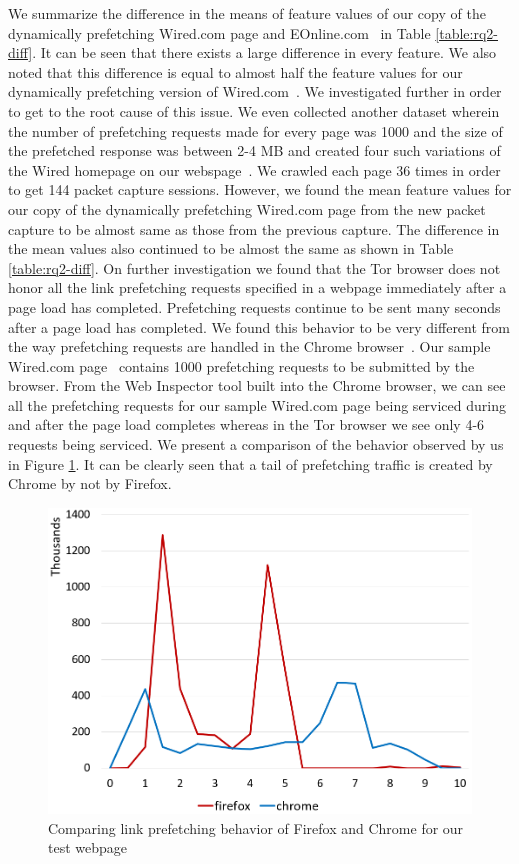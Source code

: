 We summarize the difference in the means of feature values of our copy of the dynamically prefetching Wired.com page and EOnline.com~\cite{eonline} in Table \ref{table:rq2-diff}. It can be seen that there exists a large difference in every feature. 
We also noted that this difference is equal to almost half the feature values for our dynamically prefetching version of Wired.com~\cite{tj-wired}. 
We investigated further in order to get to the root cause of this issue. 
We even collected another dataset wherein the number of prefetching requests made for every page was 1000 and the size of the prefetched response was between 2-4 MB and created four such variations of the Wired homepage on our webspage~\cite{tj-wired}. 
We crawled each page 36 times in order to get 144 packet capture sessions.
However, we found the mean feature values for our copy of the dynamically prefetching Wired.com page from the new packet capture to be almost same as those from the previous capture. 
The difference in the mean values also continued to be almost the same as shown in Table \ref{table:rq2-diff}.
On further investigation we found that the Tor browser does not honor all the link prefetching requests specified in a webpage immediately after a page load has completed. 
Prefetching requests continue to be sent many seconds after a page load has completed. 
We found this behavior to be very different from the way prefetching requests are handled in the Chrome browser~\cite{chrome}. 
Our sample Wired.com page~\cite{tj-wired} contains 1000 prefetching requests to be submitted by the browser.
From the Web Inspector tool built into the Chrome browser, we can see all the prefetching requests for our sample Wired.com page being serviced during and after the page load completes whereas in the Tor browser we see only 4-6 requests being serviced.
We present a comparison of the behavior observed by us in Figure \ref{fig:firechrome}. It can be clearly seen that a tail of prefetching traffic is created by Chrome by not by Firefox.
\begin{figure}[h]
\includegraphics[width=1\columnwidth]{figures/firechrome.png}
\centering
\caption{Comparing link prefetching behavior of Firefox and Chrome for our test webpage\cite{tj-wired}}
\label{fig:firechrome}
\end{figure}




